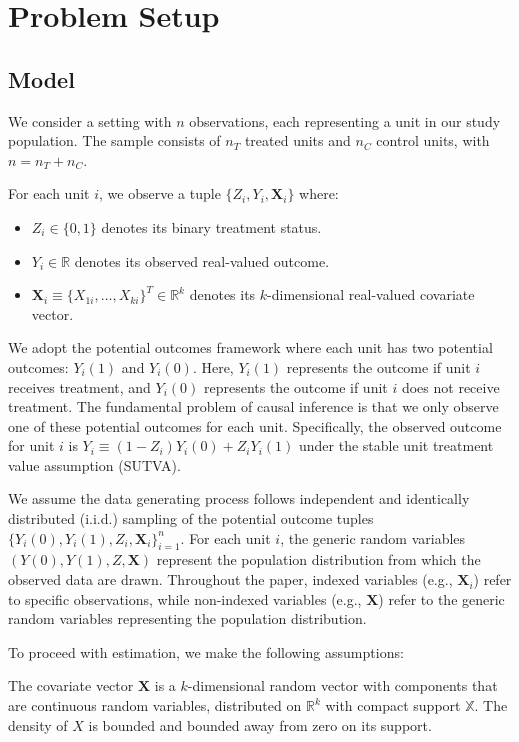 \documentclass{mytemplate}
\begin{document}
\section{Problem Setup}

\subsection{Model}
\label{sec:model}
We consider a setting with $n$ observations, each representing a unit in our study population. The sample consists of $n_T$ treated units and $n_C$ control units, with $n = n_T + n_C$.

For each unit $i$, we observe a tuple $\{Z_i, Y_i, \mathbf{X}_i\}$ where:
\begin{itemize}
    \item $Z_i \in \{0,1\}$ denotes its binary treatment status.
    \item $Y_i \in \mathbb{R}$ denotes its observed real-valued outcome.
    \item $\mathbf{X}_i \equiv \{X_{1i}, \dots, X_{ki} \}^T \in \mathbb{R}^k$ denotes its $k$-dimensional real-valued covariate vector.
\end{itemize}

We adopt the potential outcomes framework where each unit has two potential outcomes: $Y_i(1)$ and $Y_i(0)$. Here, $Y_i(1)$ represents the outcome if unit $i$ receives treatment, and $Y_i(0)$ represents the outcome if unit $i$ does not receive treatment. The fundamental problem of causal inference is that we only observe one of these potential outcomes for each unit. Specifically, the observed outcome for unit $i$ is $Y_i \equiv (1-Z_i) Y_i(0) + Z_i Y_i(1)$ under the stable unit treatment value assumption (SUTVA). 

We assume the data generating process follows independent and identically distributed (i.i.d.) sampling of the potential outcome tuples $\{Y_i(0), Y_i(1), Z_i, \mathbf{X}_i\}_{i=1}^n$. For each unit $i$, the generic random variables $(Y(0), Y(1), Z, \mathbf{X})$ represent the population distribution from which the observed data are drawn. Throughout the paper, indexed variables (e.g., $\mathbf{X}_i$) refer to specific observations, while non-indexed variables (e.g., $\mathbf{X}$) refer to the generic random variables representing the population distribution.

To proceed with estimation, we make the following assumptions:

\begin{assumption}
\label{assum:covariate}
The covariate vector $\mathbf{X}$ is a $k$-dimensional random vector with components that are continuous random variables, distributed on $\mathbb{R}^k$ with compact support $\mathbb{X}$. The density of $X$ is bounded and bounded away from zero on its support.
\end{assumption}
\end{document}
